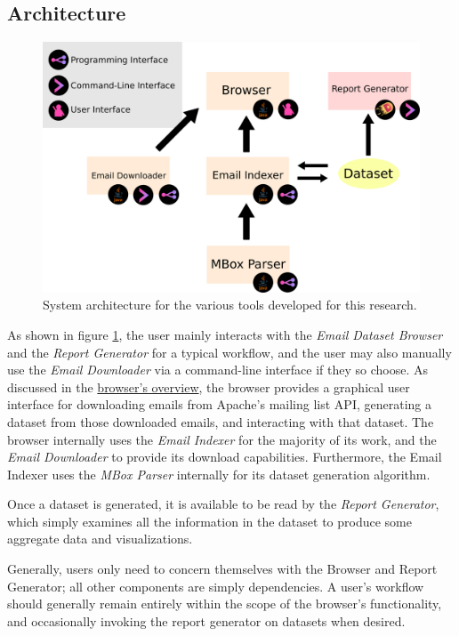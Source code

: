 \documentclass[a4paper, 12pt]{article}
\begin{document}
	\subsection{Architecture}
		\begin{figure}
			
			\includegraphics[width=\textwidth]{img/architecture.png}
			\caption{System architecture for the various tools developed for this research.}
			\label{fig:architecture-diagram}
		\end{figure}
	
		As shown in figure \ref{fig:architecture-diagram}, the user mainly interacts with the \textit{Email Dataset Browser} and the \textit{Report Generator} for a typical workflow, and the user may also manually use the \textit{Email Downloader} via a command-line interface if they so choose. As discussed in the \hyperref[sec:email-dataset-browser]{browser's overview}, the browser provides a graphical user interface for downloading emails from Apache's mailing list API, generating a dataset from those downloaded emails, and interacting with that dataset. The browser internally uses the \textit{Email Indexer} for the majority of its work, and the \textit{Email Downloader} to provide its download capabilities. Furthermore, the Email Indexer uses the \textit{MBox Parser} internally for its dataset generation algorithm.
		
		Once a dataset is generated, it is available to be read by the \textit{Report Generator}, which simply examines all the information in the dataset to produce some aggregate data and visualizations.
		
		Generally, users only need to concern themselves with the Browser and Report Generator; all other components are simply dependencies. A user's workflow should generally remain entirely within the scope of the browser's functionality, and occasionally invoking the report generator on datasets when desired.
	\newpage
\end{document}
